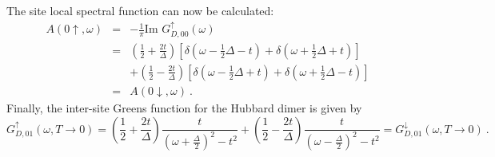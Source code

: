 \documentclass[12pt]{article}
\numberwithin{equation}{section}
\begin{document}
The site local spectral function can now be calculated:
\begin{eqnarray}
A(0\uparrow, \omega) &=& - \frac{1}{\pi}\text{Im }G_{D,00}^\uparrow(\omega)\nonumber\\
			     &=& \left( \frac{1}{2} + \frac{2t}{\Delta} \right)\left[\delta(\omega - \frac{1}{2}\Delta - t) + \delta(\omega + \frac{1}{2}\Delta + t)\right]\nonumber\\ 
			     &&+ \left( \frac{1}{2} - \frac{2t}{\Delta} \right) \left[\delta(\omega - \frac{1}{2}\Delta + t) + \delta(\omega + \frac{1}{2}\Delta - t)\right]\\ 
			     &=& A(0\downarrow, \omega)~.\nonumber
\end{eqnarray}
Finally, the inter-site Greens function for the Hubbard dimer is given by
\begin{equation}
\label{dimer_intersite_G}
	G_{D,01}^\uparrow(\omega, T \to 0) = \left( \frac{1}{2} + \frac{2t}{\Delta} \right) \frac{t}{(\omega +\frac{\Delta}{2})^2 - t^2} + \left( \frac{1}{2} - \frac{2t}{\Delta} \right) \frac{t}{(\omega -\frac{\Delta}{2})^2 - t^2} = G_{D,01}^\downarrow(\omega, T \to 0)~.
\end{equation}
\end{document}
